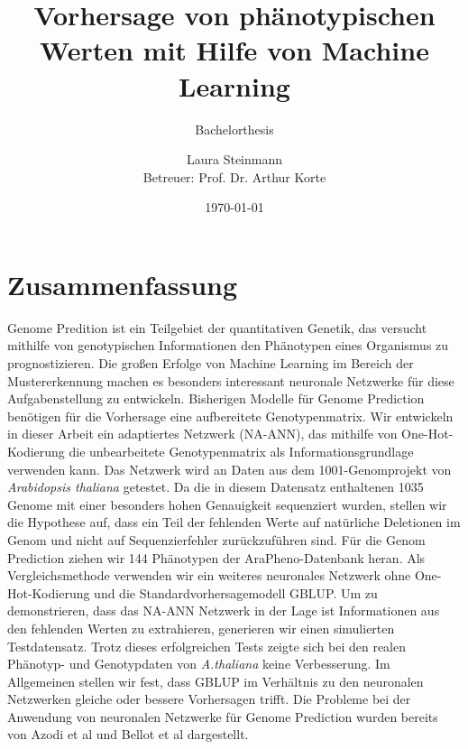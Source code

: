 \documentclass[ngerman,onecolumn,bibliography=totocnumbered]{scrreprt}
\title{Vorhersage von phänotypischen Werten mit Hilfe von Machine Learning}
\subtitle{\vspace{1cm}Bachelorthesis}
\author{Laura Steinmann \\ Betreuer: Prof. Dr. Arthur Korte}
\date{\today}
\begin{document}
\maketitle
\thispagestyle{empty}
\newpage
\setcounter{page}{1}

\chapter*{Zusammenfassung}
Genome Predition ist ein Teilgebiet der quantitativen Genetik, das versucht mithilfe von genotypischen Informationen den Phänotypen eines Organismus zu prognostizieren. Die großen Erfolge von Machine Learning im Bereich der Mustererkennung machen es besonders interessant neuronale Netzwerke für diese Aufgabenstellung zu entwickeln. Bisherigen Modelle für Genome Prediction benötigen für die Vorhersage eine aufbereitete Genotypenmatrix. Wir entwickeln in dieser Arbeit ein adaptiertes Netzwerk (NA-ANN), das mithilfe von One-Hot-Kodierung die unbearbeitete Genotypenmatrix als Informationsgrundlage verwenden kann. Das Netzwerk wird an Daten aus dem 1001-Genomprojekt von \textit{Arabidopsis thaliana} getestet. Da die in diesem Datensatz enthaltenen 1035 Genome mit einer besonders hohen Genauigkeit sequenziert wurden, stellen wir die Hypothese auf, dass ein Teil der fehlenden Werte auf natürliche Deletionen im Genom und nicht auf Sequenzierfehler zurückzuführen sind. Für die Genom Prediction ziehen wir 144 Phänotypen der AraPheno-Datenbank heran. Als Vergleichsmethode verwenden wir ein weiteres neuronales Netzwerk ohne One-Hot-Kodierung und die Standardvorhersagemodell GBLUP. Um zu demonstrieren, dass das NA-ANN Netzwerk in der Lage ist Informationen aus den fehlenden Werten zu extrahieren, generieren wir einen simulierten Testdatensatz. Trotz dieses erfolgreichen Tests zeigte sich bei den realen Phänotyp- und Genotypdaten von \textit{A.thaliana} keine Verbesserung. Im Allgemeinen stellen wir fest, dass GBLUP im Verhältnis zu den neuronalen Netzwerken gleiche oder bessere Vorhersagen trifft. Die Probleme bei der Anwendung von neuronalen Netzwerke für Genome Prediction wurden bereits von Azodi et al \cite{azodi2019} und Bellot et al \cite{bellot2018} dargestellt.
\newpage
\tableofcontents
{}

\newpage

\newpage

\newpage

\newpage
\appendix
\addtocounter{chapter}{1}
\listoffigures
\printbibliography
\newpage
\end{document}
